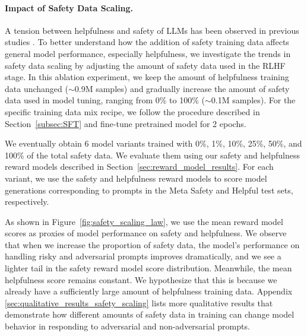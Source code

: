 \paragraph{Impact of Safety Data Scaling.}

A tension between helpfulness and safety of LLMs has been observed in previous studies \citep{bai2022training}. 
To better understand how the addition of safety training data affects general model performance, especially helpfulness, we investigate the trends in safety data scaling by adjusting the amount of safety data used in the RLHF stage. 
In this ablation experiment, we keep the amount of helpfulness training data unchanged ($\sim$0.9M samples) and gradually increase the amount of safety data used in model tuning, ranging from 0\% to 100\% ($\sim$0.1M samples). For the specific training data mix recipe, we follow the procedure described in Section~\ref{subsec:SFT} and fine-tune \cinnamon pretrained model for 2 epochs. 

We eventually obtain 6 model variants trained with 0\%, 1\%, 10\%, 25\%, 50\%, and 100\% of the total safety data. We evaluate them using our safety and helpfulness reward models described in Section~\ref{sec:reward_model_results}. For each variant, we use the safety and helpfulness reward models to score model generations corresponding to prompts in the Meta Safety and Helpful test sets, respectively.

As shown in Figure~\ref{fig:safety_scaling_law}, we use the mean reward model scores as proxies of model performance on safety and helpfulness. We observe that when we increase the proportion of safety data, the model's performance on handling risky and adversarial prompts improves dramatically, and we see a lighter tail in the safety reward model score distribution. Meanwhile, the mean helpfulness score remains constant. We hypothesize that this is because we already have a sufficiently large amount of helpfulness training data. 
Appendix \ref{sec:qualitative_results_safety_scaling} lists more qualitative results that demonstrate how different amounts of safety data in training can change model behavior in responding to adversarial and non-adversarial prompts.

